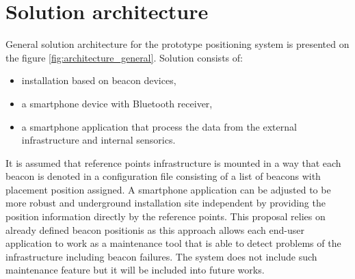 \documentclass[../main.tex]{subfiles}
\begin{document}

\section{Solution architecture} %
\label{sec:solution_architecture}

General solution architecture for the prototype positioning system is presented on the figure \ref{fig:architecture_general}. Solution consists of:
\begin{itemize}
	\item installation based on beacon devices,
	\item a smartphone device with Bluetooth receiver,
	\item a smartphone application that process the data from the external infrastructure and internal sensorics.
\end{itemize}

It is assumed that reference points infrastructure is mounted in a way that each beacon is denoted in a configuration file consisting of a list of beacons with placement position assigned. A smartphone application can be adjusted to be more robust and underground installation site independent by providing the position information directly by the reference points. This proposal relies on already defined beacon positionis as this approach allows each end-user application to work as a maintenance tool that is able to detect problems of the infrastructure including beacon failures. The system does not include such maintenance feature but it will be included into future works.
\end{document}
